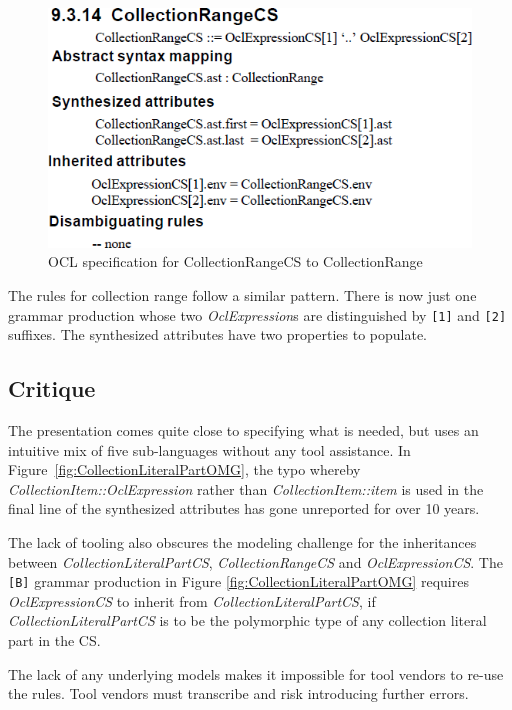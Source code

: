\documentclass{llncs}
\begin{document}
\begin{figure}[htbp]
\centering
\includegraphics[scale=0.45]{images/CollectionRangeOMG.png}
\caption{OCL specification for CollectionRangeCS to CollectionRange}
\label{fig:CollectionRangeOMG}
\end{figure}
The rules for collection range follow a similar pattern. There is now just one grammar production whose two \emph{OclExpression}s are distinguished by \verb$[1]$ and \verb$[2]$ suffixes. The synthesized attributes have two properties to populate. 

\subsection{Critique}
The presentation comes quite close to specifying what is needed, but uses an intuitive mix of five sub-languages without any tool assistance. In Figure~\ref{fig:CollectionLiteralPartOMG}, the typo whereby \emph{CollectionItem::OclExpression} rather than \emph{CollectionItem::item} is used in the final line of the synthesized attributes has gone unreported for over 10 years.

The lack of tooling also obscures the modeling challenge for the inheritances between \emph{CollectionLiteralPartCS}, \emph{CollectionRangeCS} and \emph{OclExpressionCS}. The \verb$[B]$ grammar production in Figure \ref{fig:CollectionLiteralPartOMG} requires \emph{OclExpressionCS} to inherit from \emph{CollectionLiteralPartCS}, if \emph{CollectionLiteralPartCS} is to be the polymorphic type of any collection literal part in the CS.

The lack of any underlying models makes it impossible for tool vendors to re-use the rules. Tool vendors must transcribe and risk introducing further errors.

\end{document}
